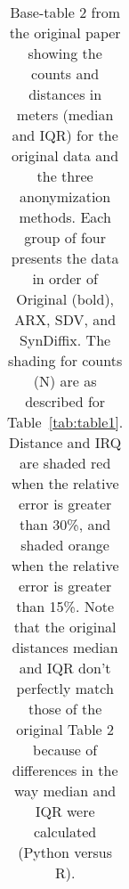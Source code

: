 \begin{table}
\begin{center}
\begin{small}
\begin{tabular}{lllll}
      \bottomrule
      \end{tabular}
      \end{small}
      \caption{Base-table 2 from the original paper showing the counts and distances in meters (median and IQR) for the original data and the three anonymization methods. Each group of four presents the data in order of Original (bold), ARX, SDV, and SynDiffix. The shading for counts (N) are as described for Table~\ref{tab:table1}. Distance and IRQ are shaded \colorbox{color-very-bad}{red} when the relative error is greater than 30\%, and shaded \colorbox{color-bad}{orange} when the relative error is greater than 15\%.  Note that the original distances median and IQR don't perfectly match those of the original Table 2 because of differences in the way median and IQR were calculated (Python versus R).}
      \label{tab:table2}
      \end{center}
      \end{table}
      \setlength{\fboxsep}{3pt}
    